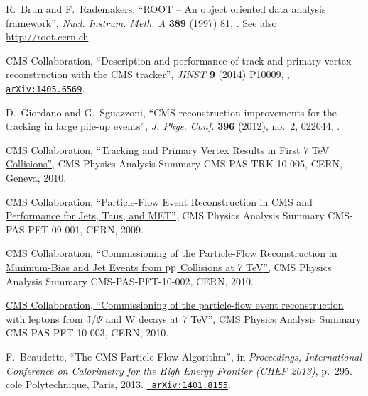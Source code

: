 \documentclass[12pt]{thesis}  %
\newcommand{\Pp}{\ensuremath{\cmsSymbolFace{p}}\xspace}
\begin{document}
\begin{thebibliography}{100}
\hrefCMSnoop {} {R.~Brun and F.~Rademakers, ``{ROOT} -- An object oriented data
  analysis framework'',} \textit{ Nucl. Instrum. Meth. A} \textbf{ 389} (1997)
  81,
  \href{http://dx.doi.org/10.1016/S0168-9002(97)00048-X}{}.
  See also \url{http://root.cern.ch}.

\hrefCMSnoop {} {{ CMS} Collaboration, ``Description and performance of track
  and primary-vertex reconstruction with the CMS tracker'',} \textit{ JINST}
  \textbf{ 9} (2014) P10009,
  \href{http://dx.doi.org/10.1088/1748-0221/9/10/P10009}{},
  \href{http://www.arXiv.org/abs/1405.6569}{\texttt{ arXiv:1405.6569}}.

\hrefCMSnoop {} {D.~Giordano and G.~Sguazzoni, ``CMS reconstruction
  improvements for the tracking in large pile-up events'',} \textit{ J. Phys.
  Conf.} \textbf{ 396} (2012), no.~2, 022044,
  \href{http://dx.doi.org/10.1088/1742-6596/396/2/022044}{}.

\href {http://cds.cern.ch/record/1279383/} {{ CMS} Collaboration, ``{Tracking
  and Primary Vertex Results in First 7 TeV Collisions}'',} CMS Physics
  Analysis Summary CMS-PAS-TRK-10-005, CERN, Geneva, 2010.

\href {http://cds.cern.ch/record/1194487} {{ CMS} Collaboration,
  ``Particle-Flow Event Reconstruction in CMS and Performance for Jets, Taus,
  and MET'',} CMS Physics Analysis Summary CMS-PAS-PFT-09-001, CERN, 2009.

\href {http://cdsweb.cern.ch/record/1279341} {{ CMS} Collaboration,
  ``Commissioning of the Particle-Flow Reconstruction in Minimum-Bias and Jet
  Events from {$\Pp\Pp$} Collisions at 7 {TeV}'',} CMS Physics Analysis Summary
  CMS-PAS-PFT-10-002, CERN, 2010.

\href {http://cdsweb.cern.ch/record/1279347} {{ CMS} Collaboration,
  ``Commissioning of the particle-flow event reconstruction with leptons from
  {J}/$\Psi$ and {W} decays at 7 {TeV}'',} CMS Physics Analysis Summary
  CMS-PAS-PFT-10-003, CERN, 2010.

\hrefCMSnoop {} {F.~Beaudette, ``{The CMS Particle Flow Algorithm}'',} in
  \textit{ {Proceedings, International Conference on Calorimetry for the High
  Energy Frontier (CHEF 2013)}}, p.~295.
cole Polytechnique, Paris, 2013.
\newblock
\href{http://www.arXiv.org/abs/1401.8155}{\texttt{ arXiv:1401.8155}}.
\newblock


\end{thebibliography}
\end{document}
